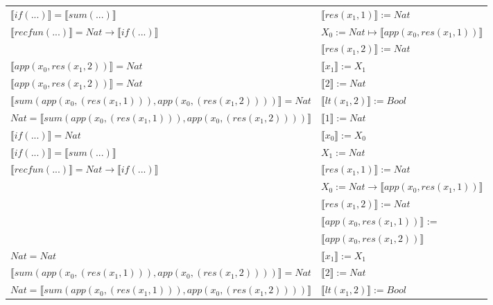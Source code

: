 \begin{exercise}
\begin{description}
\begin{center}
\begin{longtable}[!h]{ | l | l | }
                        $ \llbracket if(...) \rrbracket =  \llbracket sum(...) \rrbracket$ & $\llbracket res(x_1,1) \rrbracket := Nat$\\ 
                        $ \llbracket recfun(...) \rrbracket =   Nat  \to  \llbracket if(...) \rrbracket $ & $X_0 := Nat \mapsto  \llbracket app(x_0, res(x_1,1)) \rrbracket$  \\ 
                        & $ \llbracket res(x_1,2) \rrbracket := Nat$ \\
                    \hline
                        $ \llbracket app(x_0, res(x_1,2)) \rrbracket = Nat$ &  $ \llbracket x_1 \rrbracket := X_1$\\
                        $ \llbracket app(x_0, res(x_1,2)) \rrbracket = Nat$ &   $ \llbracket 2 \rrbracket := Nat$\\  
                        $ \llbracket sum(app(x_0, (res(x_1,1))), app(x_0, (res(x_1,2))))  \rrbracket = Nat$ & $ \llbracket lt(x_1 , 2) \rrbracket := Bool$\\ 
                        $Nat =  \llbracket sum(app(x_0, (res(x_1,1))), app(x_0, (res(x_1,2)))) \rrbracket$ &    $ \llbracket 1 \rrbracket := Nat$\\
                        $ \llbracket if(...) \rrbracket = Nat$ &  $ \llbracket x_0 \rrbracket := X_0$\\ 
                        $ \llbracket if(...) \rrbracket =  \llbracket sum(...) \rrbracket$ &  $X_1 := Nat$\\ 
                        $ \llbracket recfun(...) \rrbracket =   Nat  \to  \llbracket if(...) \rrbracket $ &   $ \llbracket res(x_1,1) \rrbracket := Nat$\\ 
                        &   $X_0 := Nat \to  \llbracket app(x_0, res(x_1,1)) \rrbracket$\\ 
                        &  $ \llbracket res(x_1,2) \rrbracket := Nat$ \\
			     &  $ \llbracket app(x_0, res(x_1,1)) \rrbracket$ := \\
			     &  $ \llbracket app(x_0, res(x_1,2)) \rrbracket$\\
                    \hline
                        $ Nat = Nat$ &  $ \llbracket x_1 \rrbracket := X_1$\\   
                        $ \llbracket sum(app(x_0, (res(x_1,1))), app(x_0, (res(x_1,2))))  \rrbracket = Nat$ &  $ \llbracket 2 \rrbracket := Nat$\\
                        $Nat =  \llbracket sum(app(x_0, (res(x_1,1))), app(x_0, (res(x_1,2)))) \rrbracket$ & $ \llbracket lt(x_1 , 2) \rrbracket := Bool$\\

\end{longtable}
\end{center}
\end{description}
\end{exercise}
